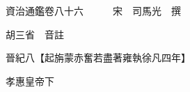 










 


 
 


 

  
  
  
  
  





  
  
  
  
  
 
  

  

  
  
  



  

 
 

  
   




  

  
  


  　　資治通鑑卷八十六　　　宋　司馬光　撰

　　胡三省　音註

　　晉紀八【起旃蒙赤奮若盡著雍執徐凡四年】

　　孝惠皇帝下

